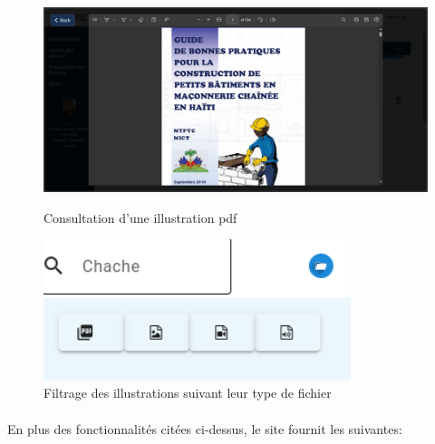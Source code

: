 			
		\begin{figure}[htb]
			\centering
			\begin{minipage}{0.45\textwidth}
				\centering
				\includegraphics[width=\textwidth]{Pictures/PageDeConsultation.png} 
				\caption{Consultation d'une illustration pdf}
				\label{FigConsultationFleDize}
			\end{minipage}
			\hspace{5pt}
			\begin{minipage}{0.3\textwidth}
				\centering
				\includegraphics[width=0.8\textwidth]{Pictures/Filtre.png}
				\caption{Filtrage des illustrations suivant leur type de fichier}
				\label{FigFiltreIllustration}
			\end{minipage}
		\end{figure}
		
		\paragraph{} En plus des fonctionnalit\'es cit\'ees ci-dessus, le site fournit les suivantes:
		
